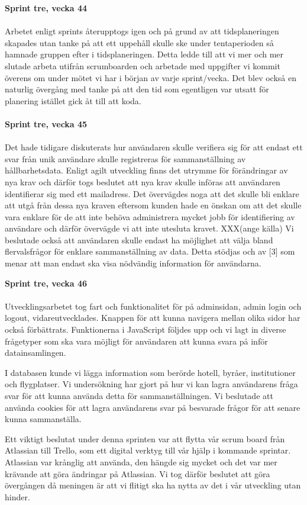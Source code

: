 \documentclass[12pt]{article}
\begin{document}
\textbf{Sprint tre, vecka 44}\\\\
Arbetet enligt sprints återupptogs igen och på grund av att tidsplaneringen skapades utan tanke på att ett uppehåll skulle ske under tentaperioden så hamnade gruppen efter i tidsplaneringen. Detta ledde till att vi mer och mer slutade arbeta utifrån scrumboarden och arbetade med uppgifter vi kommit överens om under mötet vi har i början av varje sprint/vecka. Det blev också en naturlig övergång med tanke på att den tid som egentligen var utsatt för planering istället gick åt till att koda. \\\\
\textbf{Sprint tre, vecka 45} \\\\
Det hade tidigare diskuterats hur användaren skulle verifiera sig för att endast ett svar från unik användare skulle registreras för sammanställning av hållbarhetsdata. Enligt agilt utveckling finns det utrymme för förändringar av nya krav och därför togs beslutet att nya krav skulle införas att användaren identifierar sig med ett mailadress. Det övervägdes noga att det skulle bli enklare att utgå från dessa nya kraven eftersom kunden hade en önskan om att det skulle vara enklare för de att inte behöva administrera mycket jobb för identifiering av användare och därför övervägde vi att inte utesluta kravet. XXX(ange källa)
Vi beslutade också att användaren skulle endast ha möjlighet att välja bland flervalsfrågor för enklare sammanställning av data. Detta stödjas och av [3] som menar att man endast ska visa nödvändig information för användarna.  

\textbf{Sprint tre, vecka 46} \\\\
Utvecklingsarbetet tog fart och funktionalitet för på adminsidan, admin login och logout,  vidareutvecklades. Knappen för att kunna navigera mellan olika sidor har också förbättrats. Funktionerna i JavaScript följdes upp och vi lagt in diverse frågetyper som ska vara möjligt för användaren att kunna svara på inför datainsamlingen. 

I databasen kunde vi lägga information som berörde hotell, byråer, institutioner och flygplatser. Vi undersökning har gjort på hur vi kan lagra användarens fråga svar för att kunna använda detta för sammanställningen. Vi beslutade att använda cookies för att lagra användarens svar på besvarade frågor för att senare kunna sammanställa. 

Ett viktigt beslutat under denna sprinten var att flytta vår scrum board från Atlassian till Trello, som ett digital verktyg till vår hjälp i kommande sprintar. Atlassian var krånglig att använda, den hängde sig mycket och det var mer krävande att göra ändringar på Atlassian. Vi tog därför beslutet att göra övergången då meningen är att vi flitigt ska ha nytta av det i vår utveckling utan hinder. 
\end{document}
